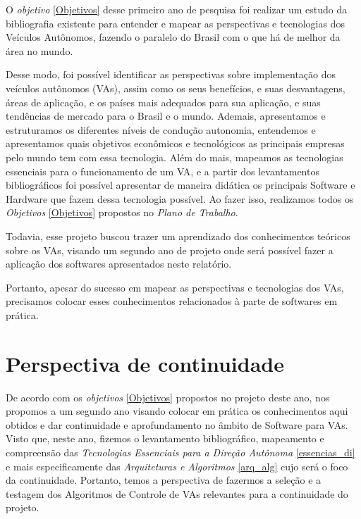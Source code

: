 O \textit{objetivo} \ref{Objetivos} desse primeiro ano de pesquisa foi realizar um estudo da bibliografia existente para entender e mapear as perspectivas e tecnologias dos Veículos Autônomos, fazendo o paralelo do Brasil com o que há de melhor da área no mundo. 

Desse modo, foi possível identificar as perspectivas sobre implementação dos veículos autônomos (VAs), assim como os seus benefícios, e suas desvantagens, áreas de aplicação, e os países mais adequados para sua aplicação, e suas tendências de mercado para o Brasil e o mundo.
Ademais, apresentamos e estruturamos os diferentes níveis de condução autonomia, entendemos e apresentamos quais objetivos econômicos e tecnológicos as principais empresas pelo mundo tem com essa tecnologia.
Além do mais, mapeamos as tecnologias essenciais para o funcionamento de um VA, e a partir dos levantamentos bibliográficos foi possível apresentar de maneira didática os principais Software e Hardware que fazem dessa tecnologia possível.
Ao fazer isso, realizamos todos os \textit{Objetivos} \ref{Objetivos} propostos no \textit{Plano de Trabalho}.

Todavia, esse projeto buscou trazer um aprendizado dos conhecimentos teóricos sobre os VAs, visando um segundo ano de projeto onde será possível fazer a  aplicação dos softwares apresentados neste relatório.

Portanto, apesar do sucesso em mapear as perspectivas e tecnologias dos VAs, precisamos colocar esses conhecimentos relacionados à parte de softwares em prática.



\chapter{Perspectiva de continuidade} \label{continuidade}

De acordo com os \textit{objetivos} \ref{Objetivos} propostos no projeto deste ano, nos propomos a um segundo ano visando colocar em prática os conhecimentos aqui obtidos e dar continuidade e aprofundamento no âmbito de Software para VAs. Visto que, neste ano, fizemos o levantamento bibliográfico, mapeamento e compreensão das \textit{Tecnologias Essenciais para a Direção Autônoma} \ref{essencias_di} e mais especificamente das \textit{Arquiteturas e Algoritmos} \ref{arq_alg} cujo será o foco da continuidade. Portanto, temos a perspectiva de fazermos a seleção e a testagem dos Algoritmos de Controle de VAs relevantes para a continuidade do projeto.

